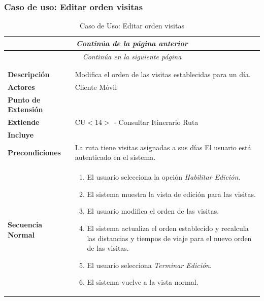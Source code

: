 \newpage
\subsubsection*{Caso de uso: Editar orden visitas }
\begin{longtable}{| p{4cm} | p{10cm} |}
\endfirsthead
\multicolumn{2}{c}{\textit{Continúa de la página anterior}}\\[12pt]
\hline
\endhead
\hline
\multicolumn{2}{c}{\textit{Continúa en la siguiente página}} \\
\endfoot
\hline
\caption{Caso de Uso: Editar orden visitas}\label{fig:1}\\
\endlastfoot


\hline
\multicolumn{2}{|c|}{\textbf{CU$<$15$>$ - Editar Orden Visitas}} \\

\hline
\textbf{Descripción} &
Modifica el orden de las visitas establecidas para un día.\\

\hline
\textbf{Actores} &
Cliente Móvil\\

\hline
\textbf{Punto de Extensión} &
\\

\hline
\textbf{Extiende} &
CU$<$14$>$ - Consultar Itinerario Ruta
\\

\hline
\textbf{Incluye} &
\\

\hline
\textbf{Precondiciones} &
La ruta tiene visitas asignadas a sus días\newline
El usuario está autenticado en el sistema.\\

\hline
\textbf{Secuencia Normal} &\mbox{}\par\vspace{-\baselineskip}
\begin{enumerate}[leftmargin=0.7cm, topsep=0.1cm]
\item El usuario selecciona la opción \textit{Habilitar Edición}.
\item El sistema muestra la vista de edición para las visitas.
\item El usuario modifica el orden de las visitas.
\item El sistema actualiza el orden establecido y recalcula las distancias y tiempos de viaje para el nuevo orden de las visitas.
\item El usuario selecciona \textit{Terminar Edición}.
\item El sistema vuelve a la vista normal.
\end{enumerate}



\end{longtable}
